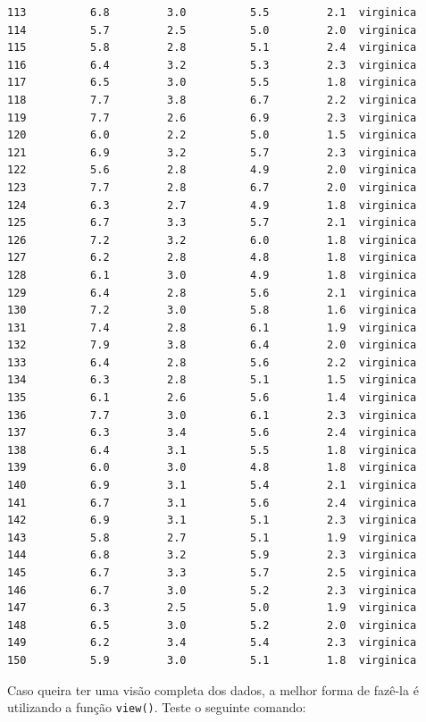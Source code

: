 \documentclass[
  brazilian,
]{book}
\begin{document}
\begin{verbatim}
113          6.8         3.0          5.5         2.1  virginica
114          5.7         2.5          5.0         2.0  virginica
115          5.8         2.8          5.1         2.4  virginica
116          6.4         3.2          5.3         2.3  virginica
117          6.5         3.0          5.5         1.8  virginica
118          7.7         3.8          6.7         2.2  virginica
119          7.7         2.6          6.9         2.3  virginica
120          6.0         2.2          5.0         1.5  virginica
121          6.9         3.2          5.7         2.3  virginica
122          5.6         2.8          4.9         2.0  virginica
123          7.7         2.8          6.7         2.0  virginica
124          6.3         2.7          4.9         1.8  virginica
125          6.7         3.3          5.7         2.1  virginica
126          7.2         3.2          6.0         1.8  virginica
127          6.2         2.8          4.8         1.8  virginica
128          6.1         3.0          4.9         1.8  virginica
129          6.4         2.8          5.6         2.1  virginica
130          7.2         3.0          5.8         1.6  virginica
131          7.4         2.8          6.1         1.9  virginica
132          7.9         3.8          6.4         2.0  virginica
133          6.4         2.8          5.6         2.2  virginica
134          6.3         2.8          5.1         1.5  virginica
135          6.1         2.6          5.6         1.4  virginica
136          7.7         3.0          6.1         2.3  virginica
137          6.3         3.4          5.6         2.4  virginica
138          6.4         3.1          5.5         1.8  virginica
139          6.0         3.0          4.8         1.8  virginica
140          6.9         3.1          5.4         2.1  virginica
141          6.7         3.1          5.6         2.4  virginica
142          6.9         3.1          5.1         2.3  virginica
143          5.8         2.7          5.1         1.9  virginica
144          6.8         3.2          5.9         2.3  virginica
145          6.7         3.3          5.7         2.5  virginica
146          6.7         3.0          5.2         2.3  virginica
147          6.3         2.5          5.0         1.9  virginica
148          6.5         3.0          5.2         2.0  virginica
149          6.2         3.4          5.4         2.3  virginica
150          5.9         3.0          5.1         1.8  virginica
\end{verbatim}

Caso queira ter uma visão completa dos dados, a melhor forma de fazê-la é utilizando a função \texttt{view()}. Teste o seguinte comando:
\end{document}
